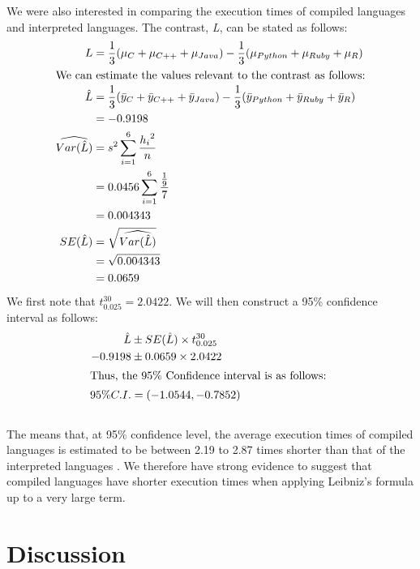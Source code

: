 \documentclass[12pt,halfline,a4paper,]{ouparticle}
\begin{document}
We were also interested in comparing the execution times of compiled
languages and interpreted languages. The contrast, \emph{L}, can be
stated as follows: \begin{align*}
L &= \frac{1}{3} (\mu_C + \mu_{C++} + \mu_{Java}) - \frac{1}{3}(\mu_{Python} + \mu_{Ruby} + \mu_{R})\\
\intertext{We can estimate the values relevant to the contrast as follows:}
\hat{L} &= \frac{1}{3} (\bar{y}_C + \bar{y}_{C++} + \bar{y}_{Java}) - \frac{1}{3}(\bar{y}_{Python} + \bar{y}_{Ruby} + \bar{y}_{R})\\
&= -0.9198 \\
\widehat{Var(\hat{L})} &= s^{2} \sum_{i=1}^{6} \frac{{h_i}^2}{n}\\
&= 0.0456\sum_{i=1}^{6}\frac{\frac{1}{9}}{7}\\
&= 0.004343\\
SE(\hat{L}) &= \sqrt{\widehat{Var(\hat{L})}}\\
 &= \sqrt{0.004343}\\
 &= 0.0659
\end{align*} We first note that \(t_{0.025}^{30} = 2.0422\). We will
then construct a 95\% confidence interval as follows: \begin{align*}
\hat{L}&\pm SE(\hat{L})\times t_{0.025}^{30}\\
-0.9198 &\pm 0.0659 \times 2.0422\\
\intertext{Thus, the 95\% Confidence interval is as follows: }
95\%C.I. &= (-1.0544 ,-0.7852)
\end{align*}\\
The means that, at 95\% confidence level, the average execution times of
compiled languages is estimated to be between 2.19 to 2.87 times shorter
than that of the interpreted languages . We therefore have strong
evidence to suggest that compiled languages have shorter execution times
when applying Leibniz's formula up to a very large term. \newpage

\hypertarget{discussion}{%
\section{Discussion}\label{discussion}}
\end{document}
